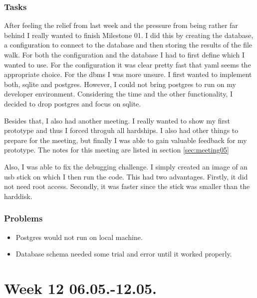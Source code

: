 \subsubsection{Tasks}

After feeling the relief from last week and the pressure from being rather far behind I really wanted to finish Milestone 01. I did this by creating the database, a configuration to connect to the database and then storing the results of the file walk. For both the configuration and the database I had to first define which I wanted to use. For the configuration it was clear pretty fast that \gls{yaml} seems the appropriate choice. For the \gls{dbms} I was more unsure. I first wanted to implement both, \gls{sqlite} and \gls{postgres}. However, I could not bring \gls{postgres} to run on my developer environment. Considering the time and the other functionality, I decided to drop \gls{postgres} and focus on \gls{sqlite}.

Besides that, I also had another meeting. I really wanted to show my first prototype and thus I forced throguh all hardships. I also had other things to prepare for the meeting, but finally I was able to gain valuable feedback for my prototype. The notes for this meeting are listed in section \ref{sec:meeting05}

Also, I was able to fix the debugging challenge. I simply created an image of an usb stick on which I then run the code. This had two advantages. Firstly, it did not need root access. Secondly, it was faster since the stick was smaller than the harddisk.

\subsubsection{Problems}

\begin{itemize}
    \item Postgres would not run on local machine. 
    \item Database schema needed some trial and error until it worked properly.
\end{itemize}

\section{Week 12 06.05.-12.05.}
\label{sec:journal:week12}

